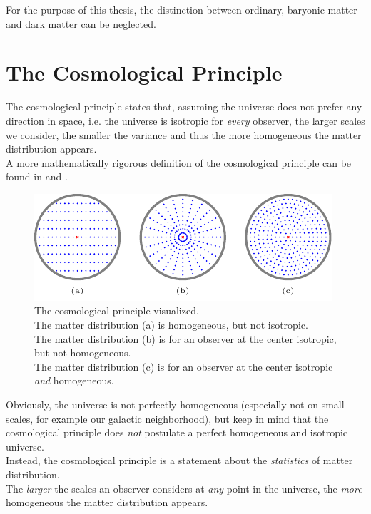 \noindent For the purpose of this thesis, the distinction between ordinary, baryonic matter and dark matter can be neglected.



\section{The Cosmological Principle}

The cosmological principle states that, assuming the universe does not prefer any direction in space, i.e. the universe is isotropic for \textit{every} observer, the larger scales we consider, the smaller the variance and thus the more homogeneous the matter distribution appears. \\
A more mathematically rigorous definition of the cosmological principle can be found in \cite[p.~5]{Bartelmann2019} and \cite[p.~713/714]{MTW2017}.
\begin{figure}[H]
    \centering
    \includegraphics[scale=2.2]{figures/tikz/homogeneous-isotropic/homogeneous-isotropic}
    \caption{The cosmological principle visualized. \\
    The matter distribution (a) is homogeneous, but not isotropic. \\
    The matter distribution (b) is for an observer at the center isotropic, but not homogeneous. \\
    The matter distribution (c) is for an observer at the center isotropic \textit{and} homogeneous.}
    \label{fig:homogeneous-isotropic}
\end{figure}
\noindent Obviously, the universe is not perfectly homogeneous (especially not on small scales, for example our galactic neighborhood), but keep in mind that the cosmological principle does \textit{not} postulate a perfect homogeneous and isotropic universe. \\
Instead, the cosmological principle is a statement about the \textit{statistics} of matter distribution. \\
The \textit{larger} the scales an observer considers at \textit{any} point in the universe, the \textit{more} homogeneous the matter distribution appears. \\

